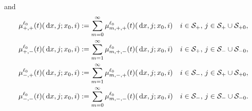 and
\begin{align}
		\mu^{\ell_0}_{+,+}(t)(\, \mathrm{d} x,j;x_0,i)  &:= \sum_{m=0}^\infty \mu^{\ell_0}_{m,+,+}(t)(\, \mathrm{d} x,j;x_0,i)  && i\in\mathcal{S}_+,\,j\in\mathcal S_+\cup\mathcal{S}_{+0}, \label{eqn: ljg97skg}
		\\ \mu^{\ell_0}_{+,-}(t)(\, \mathrm{d} x,j;x_0,i)  &:= \sum_{m=1}^\infty \mu^{\ell_0}_{m,+,-}(t)(\, \mathrm{d} x,j;x_0,i)  && i\in\mathcal S_+,\,j\in\mathcal S_-\cup\mathcal{S}_{-0},
		\\ \mu^{\ell_0}_{-,+}(t)(\, \mathrm{d} x,j;x_0,i) &:= \sum_{m=1}^\infty \mu^{\ell_0}_{m,-,+}(t)(\, \mathrm{d} x,j;x_0,i)  && i\in\mathcal S_-,\,j\in\mathcal S_+\cup\mathcal{S}_{+0},
		\\ \mu^{\ell_0}_{-,-}(t)(\, \mathrm{d} x,j;x_0,i)  &:= \sum_{m=0}^\infty \mu^{\ell_0}_{m,-,-}(t)(\, \mathrm{d} x,j;x_0,i)  && i\in\mathcal{S}_-,\,j\in\mathcal S_-\cup\mathcal{S}_{-0}. \label{eqn: ljg97skg2}
\end{align}

